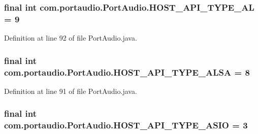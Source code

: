 \subsubsection[{\texorpdfstring{H\+O\+S\+T\+\_\+\+A\+P\+I\+\_\+\+T\+Y\+P\+E\+\_\+\+AL}{HOST_API_TYPE_AL}}]{\setlength{\rightskip}{0pt plus 5cm}final {\bf int} com.\+portaudio.\+Port\+Audio.\+H\+O\+S\+T\+\_\+\+A\+P\+I\+\_\+\+T\+Y\+P\+E\+\_\+\+AL = 9\hspace{0.3cm}{\ttfamily [static]}}\hypertarget{classcom_1_1portaudio_1_1_port_audio_a034414578c6cb7d1ef05dbb97d4030ef}{}\label{classcom_1_1portaudio_1_1_port_audio_a034414578c6cb7d1ef05dbb97d4030ef}


Definition at line 92 of file Port\+Audio.\+java.

\subsubsection[{\texorpdfstring{H\+O\+S\+T\+\_\+\+A\+P\+I\+\_\+\+T\+Y\+P\+E\+\_\+\+A\+L\+SA}{HOST_API_TYPE_ALSA}}]{\setlength{\rightskip}{0pt plus 5cm}final {\bf int} com.\+portaudio.\+Port\+Audio.\+H\+O\+S\+T\+\_\+\+A\+P\+I\+\_\+\+T\+Y\+P\+E\+\_\+\+A\+L\+SA = 8\hspace{0.3cm}{\ttfamily [static]}}\hypertarget{classcom_1_1portaudio_1_1_port_audio_a2cf938238890b34503d58db47a454e72}{}\label{classcom_1_1portaudio_1_1_port_audio_a2cf938238890b34503d58db47a454e72}


Definition at line 91 of file Port\+Audio.\+java.

\subsubsection[{\texorpdfstring{H\+O\+S\+T\+\_\+\+A\+P\+I\+\_\+\+T\+Y\+P\+E\+\_\+\+A\+S\+IO}{HOST_API_TYPE_ASIO}}]{\setlength{\rightskip}{0pt plus 5cm}final {\bf int} com.\+portaudio.\+Port\+Audio.\+H\+O\+S\+T\+\_\+\+A\+P\+I\+\_\+\+T\+Y\+P\+E\+\_\+\+A\+S\+IO = 3\hspace{0.3cm}{\ttfamily [static]}}\hypertarget{classcom_1_1portaudio_1_1_port_audio_ada483f7837f8bba9cc062f7fd068bf6f}{}\label{classcom_1_1portaudio_1_1_port_audio_ada483f7837f8bba9cc062f7fd068bf6f}


